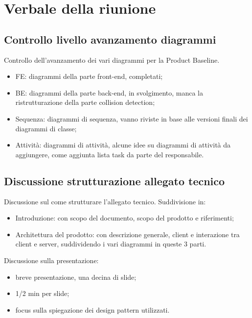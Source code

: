 
\section{Verbale della riunione}

\subsection{Controllo livello avanzamento diagrammi}
Controllo dell'avanzamento dei vari diagrammi per la Product Baseline.
\begin{itemize}
	\item {FE:} diagrammi della parte front-end, completati;
	\item {BE:} diagrammi della parte back-end, in svolgimento, manca la ristrutturazione della parte collision detection;
	\item {Sequenza:} diagrammi di sequenza, vanno riviste in base alle versioni finali dei diagrammi di classe;
	\item {Attività:} diagrammi di attività, alcune idee su diagrammi di attività da aggiungere, come aggiunta lista task da parte del responsabile.
\end{itemize}

\subsection{Discussione strutturazione allegato tecnico}
Discussione sul come strutturare l'allegato tecnico.
Suddivisione in:
\begin{itemize}
	\item {Introduzione:} con scopo del documento, scopo del prodotto e riferimenti;
	\item {Architettura del prodotto:} con descrizione generale, client e interazione tra client e server, suddividendo i vari diagrammi in queste 3 parti.
\end{itemize}
Discussione sulla presentazione:
\begin{itemize}
	\item breve presentazione, una decina di slide;
	\item 1/2 min per slide;
	\item focus sulla spiegazione dei design pattern utilizzati.
\end{itemize}

